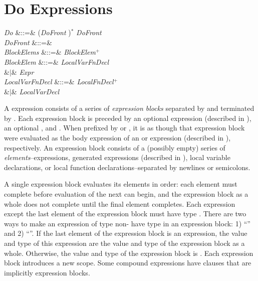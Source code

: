 %
%
%
%

\section{Do Expressions}

\begin{Grammar}
\emph{Do} &::=& (\emph{DoFront} )$^*$ \emph{DoFront} \\

\emph{DoFront} &::=&    \\

\emph{BlockElems} &::=& \emph{BlockElem}$^+$ \\

\emph{BlockElem}
&::=& \emph{LocalVarFnDecl}\\
&$|$& \emph{Expr}\\

\emph{LocalVarFnDecl}
&::=& \emph{LocalFnDecl}$^+$\\
&$|$& \emph{LocalVarDecl}\\

\end{Grammar}

A  expression consists of a series of \emph{expression blocks}
separated by  and
terminated by .  Each expression block is preceded by
an optional  expression (described in ),
an optional , and
.  When prefixed by  or , it is as though
that expression block were evaluated as the body expression of an  or
 expression (described in ), respectively.
An expression block
consists of a (possibly empty) series of \emph{elements}--expressions,
generated expressions (described in ),
local variable declarations, or local function declarations--separated
by newlines or semicolons.

A single expression block evaluates its elements in order: each
element must complete before evaluation of the next can begin, and the
expression block as a whole does not complete until the final element completes.
Each expression except the last element of the expression block
must have type \TYP{()}.
There are two ways to make an expression  of type non-\TYP{()}
have type \TYP{()} in an expression block:
1) ``'' and 2) ``''.
If the last element of the expression block is an
expression, the value and type of this expression are the value and
type of the expression block as a whole.  Otherwise, the value and
type of the expression block is \EXP{()}.  Each expression block
introduces a new scope.  Some compound expressions have clauses that
are implicitly expression blocks.

